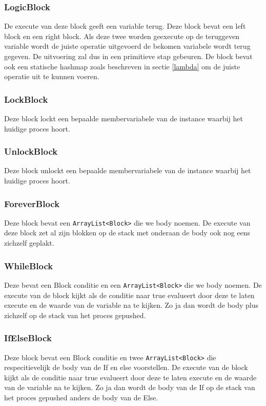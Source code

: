 \documentclass[]{article}
\begin{document}
\subsubsection{LogicBlock}
De execute van deze block geeft een variable terug. Deze block bevat een left block en een right block. Als deze twee worden geexecute op de teruggeven variable wordt de juiste operatie uitgevoerd de bekomen variabele wordt terug gegeven.
De uitvoering zal dus in een primitieve stap gebeuren. De block bevat ook een statische hashmap zoals beschreven in sectie \ref{lambda} om de juiste operatie uit te kunnen voeren.
\subsubsection{LockBlock}
Deze block lockt een bepaalde membervariabele van de instance waarbij het huidige proces hoort.
\subsubsection{UnlockBlock}
Deze block unlockt een bepaalde membervariabele van de instance waarbij het huidige proces hoort.
\subsubsection{ForeverBlock}
Deze block bevat een \texttt{ArrayList<Block>} \cite{arraylist} die we body noemen. De execute van deze block zet al zijn blokken op de stack met onderaan de body ook nog eens zichzelf geplakt.
\subsubsection{WhileBlock}
Deze bevat een Block conditie en een \texttt{ArrayList<Block>} \cite{arraylist} die we body noemen. De execute van de block kijkt als de conditie naar true evalueert door deze te laten execute en de waarde van de variable na te kijken. Zo ja dan wordt de body plus zichzelf op de stack van het proces gepushed.
\subsubsection{IfElseBlock}
Deze block bevat een Block conditie en twee \texttt{ArrayList<Block>} \cite{arraylist} die respecitievelijk de body van de If en else voorstellen. De execute van de block kijkt als de conditie naar true evalueert door deze te laten execute en de waarde van de variable na te kijken. Zo ja dan wordt de body van de If  op de stack van het proces gepushed anders de body van de Else.
\end{document}
